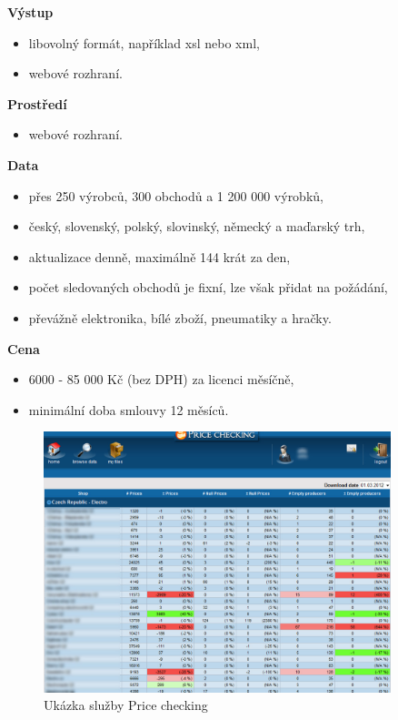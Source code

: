 \documentclass[thesis=B,czech]{FITthesis}[2012/06/26]
\begin{document}
\textbf{Výstup}
\begin{itemize}
\item libovolný formát, například xsl nebo xml,
\item webové rozhraní.
\end{itemize}

\textbf{Prostředí}
\begin{itemize}
\item webové rozhraní.
\end{itemize}

\textbf{Data}
\begin{itemize}
\item přes 250 výrobců, 300 obchodů a 1 200 000 výrobků,
\item český, slovenský, polský, slovinský, německý a maďarský trh,
\item aktualizace denně, maximálně 144 krát za den,
\item počet sledovaných obchodů je fixní, lze však přidat na požádání,
\item převážně elektronika, bílé zboží, pneumatiky a hračky.
\end{itemize}

\textbf{Cena}
\begin{itemize}
\item 6000 - 85 000 Kč (bez DPH) za licenci měsíčně,
\item minimální doba smlouvy 12 měsíců.
\end{itemize}

\begin{figure}\centering
 	\includegraphics[width=0.9\textwidth]{resources/priceChecking}
	\caption[Price checking]{Ukázka služby Price checking}\label{fig:priceChecking}
\end{figure}
\end{document}
